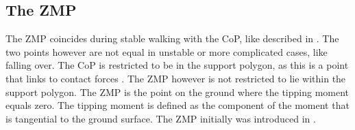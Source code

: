 \subsection{The \ac{ZMP}}
The \ac{ZMP} coincides during stable walking with the \ac{CoP}, like described in \cite{vukobratovic2004zero}. The two points however are not equal in unstable or more complicated cases, like falling over.  The \ac{CoP} is restricted to be in the support polygon, as this is a point that links to contact forces \cite{sardain2004forces}. The \ac{ZMP} however is not restricted to lie within the support polygon. The \ac{ZMP} is the point on the ground where the tipping moment equals zero. The tipping moment is defined as the component of the moment that is tangential to the ground surface. The \ac{ZMP} initially was introduced in \cite{vukobratovic1969contribution}.


